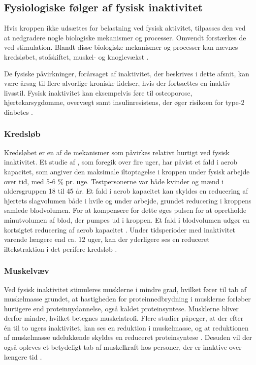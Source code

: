 \subsection{Fysiologiske følger af fysisk inaktivitet}\label{sec:FoeglerAfFiA}
Hvis kroppen ikke udsættes for belastning ved fysisk aktivitet, tilpasses den ved at nedgradere nogle biologiske mekanismer og processer. Omvendt forstærkes de ved stimulation. 
Blandt disse biologiske mekanismer og processer kan nævnes kredsløbet, stofskiftet, muskel- og knoglevækst \citep{motionsraad2007}.

De fysiske påvirkninger, forårsaget af inaktivitet, der beskrives i dette afsnit, kan være årsag til flere alvorlige kroniske lidelser, hvis der fortsættes en inaktiv livsstil. 
Fysisk inaktivitet kan eksempelvis føre til osteoporose, hjertekarsygdomme, overvægt samt insulinresistens, der øger risikoen for type-2 diabetes \citep{motionsraad2007}.

\subsubsection{Kredsløb}
Kredsløbet er en af de mekanismer som påvirkes relativt hurtigt ved fysisk inaktivitet. 
Et studie af \citeauthor{Convertino1995}, som foregik over fire uger, har påvist et fald i aerob kapacitet, som angiver den maksimale iltoptagelse i kroppen under fysisk arbejde over tid, med 5-6 \% pr. uge. 
Testpersonerne var både kvinder og mænd i aldersgruppen 18 til 45 år. 
Et fald i aerob kapacitet kan skyldes en reducering af hjertets slagvolumen både i hvile og under arbejde, grundet reducering i kroppens samlede blodvolumen. 
For at kompensere for dette øges pulsen for at opretholde minutvolumen af blod, der pumpes ud i kroppen. 
Et fald i blodvolumen udgør en kortsigtet reducering af aerob kapacitet \citep{Convertino1995}. 
Under tidsperioder med inaktivitet varende længere end ca. 12 uger, kan der yderligere ses en reduceret iltekstraktion i det perifere kredsløb \citep{Coyle1985}.

\subsubsection{Muskelvæv}
Ved fysisk inaktivitet stimuleres musklerne i mindre grad, hvilket fører til tab af muskelmasse grundet, at hastigheden for proteinnedbrydning i musklerne forløber hurtigere end proteinnydannelse, også kaldet proteinsyntese. 
Musklerne bliver derfor mindre, hvilket betegnes muskelatrofi. 
Flere studier påpeger, at der efter én til to ugers inaktivitet, kan ses en reduktion i muskelmasse, og at reduktionen af muskelmasse udelukkende skyldes en reduceret proteinsyntese \citep{Douglas2006, Bloomfield1995}. 
Desuden vil der også opleves et betydeligt tab af muskelkraft hos personer, der er inaktive over længere tid \citep{Bloomfield1995}. 

